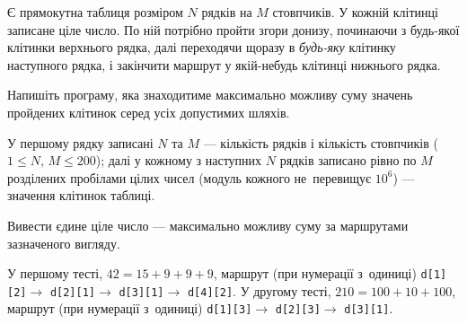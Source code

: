 ﻿Є прямокутна таблиця розміром $N$ рядків на $M$ стовпчиків. У кожній клітинці записане ціле число. 
По ній потрібно пройти згори донизу, починаючи з будь-якої клітинки верхнього рядка, 
далі переходячи щоразу в \emph{будь-яку} клітинку наступного рядка, і закінчити маршрут у якій-небудь клітинці нижнього рядка. 

Напишіть програму, яка знаходитиме максимально можливу суму значень пройдених клітинок 
серед усіх допустимих шляхів.

\InputFile
У першому рядку записані $N$ та $M$ --- кількість рядків і кількість стовпчиків 
(${1\leqslant N,\,M\leqslant 200}$); далі у кожному з наступних $N$ рядків 
записано рівно по $M$ розділених пробілами цілих чисел 
(модуль кожного не~перевищує $10^6$) --- значення клітинок таблиці.

\OutputFile
Вивести єдине ціле число --- максимально можливу суму за маршрутами зазначеного вигляду.

\Example
\begin{example}%
%
%
\end{example}

\Note
У першому тесті, $42=15+9+9+9$, маршрут (при нумерації з~одиниці)
\texttt{d[1][2]}$\to$
\texttt{d[2][1]}$\to$
\texttt{d[3][1]}$\to$
\texttt{d[4][2]}.
У другому тесті, $210=100+10+100$, маршрут (при нумерації з~одиниці)
\texttt{d[1][3]}$\to$
\texttt{d[2][3]}$\to$
\texttt{d[3][1]}.
